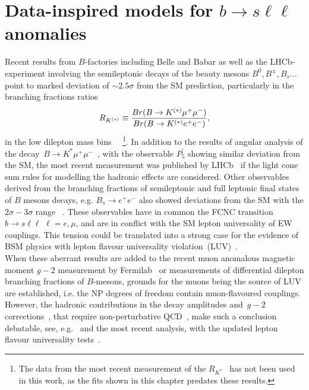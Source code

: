 
\chapter{Data-inspired models for $b \to s \ell \ell$ anomalies}\label{chap:flav}
Recent results from $B$-factories including Belle and Babar as well as the LHCb-experiment involving the semileptonic decays of the beauty mesons $B^0, B^\pm,B_s \dots$ point to marked deviation of $ \sim 2.5 \sigma$ from the SM prediction, particularly in the branching fractions ratios
\begin{equation}
R_{K^{(*)}} \equiv {Br(B \to K^{(*)} \mu^{+} \mu^{-}) \over Br(B \to K^{(*)} e^{+} e^{-})},
\end{equation}
in the low dilepton mass bins ~\cite{Aaij:2014ora,Aaij:2017vbb,Aaij:2019wad,Abdesselam:2019wac,LHCb:2021trn}~\footnote{The data from the most recent measurement of the $R_{K^*}$~\cite{LHCb:2021trn} has not been used in this work, as the fits shown in this chapter predates these results.}. In addition to the results of angular analysis of the decay~$B \to K^{*} \mu^{+} \mu^{-}$~\cite{Descotes-Genon:2013wba,Descotes-Genon:2015uva}, with the observable $P_5^\prime$  showing similar deviation from the SM, the most recent measurement was published by LHCb~\cite{LHCb:2020lmf} if the light cone sum rules for modelling  the hadronic effects are considered. Other observables derived from the branching fractions of semileptonic and full leptonic final states of $B$ mesons decays, e.g. $ B_{s} \to e^{+} e^{-}$ also showed deviations from the SM with the $2\sigma-3\sigma$ range ~\cite{Chatrchyan:2013bka,Aaij:2017vad,Aaboud:2018mst,Aaij:2020nol}. These observables have in common the FCNC transition $ b \to s \ell \ell\, \, \ell = e, \mu$, and are in conflict with the SM lepton universality of EW couplings. This tension could be translated into a strong case for the evidence of BSM physics with lepton flavour universality violation~(LUV)~\cite{Hiller:2014yaa,Hiller:2014ula,Bordone:2016gaq}.\\
When these aberrant results are added to the recent muon anomalous magnetic moment $g-2$ measurement by Fermilab~\cite{Muong-2:2021ojo} or measurements of differential dilepton branching fractions of $B$-mesons,  grounds for the muons being the source of LUV are established, i.e.  the NP degrees of freedom contain muon-flavoured couplings.  However, the hadronic contributions  in the decay amplitudes and~$g-2$ corrections~\cite{Khodjamirian:2010vf,Lyon:2014hpa,Chobanova:2017ghn,Blake:2017fyh,Bobeth:2017vxj}, that require non-perturbative QCD~\cite{Jager:2014rwa,Ciuchini:2015qxb,Arbey:2018ics,Chrzaszcz:2018yza}, make such a conclusion debatable, see, e.g.~\cite{Ciuchini:2018anp,Hurth:2020rzx} and the most recent analysis, with the updated lepton flavour universality tests~\cite{Ciuchini:2021smi}. \\
